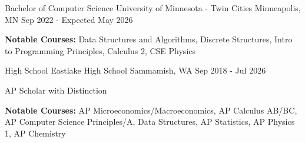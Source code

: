 

\begin{cventries}

  \cventry
    {Bachelor of Computer Science} %
    {University of Minnesota - Twin Cities} %
    {Minneapolis, MN} %
    {Sep 2022 - Expected May 2026} %
    {
      \begin{cvitems} %
        \item {\textbf{Notable Courses:} Data Structures and Algorithms, Discrete Structures, Intro to Programming Principles, Calculus 2, CSE Physics}
      \end{cvitems}
    }
    
  \cventry
    {High School} %
    {Eastlake High School} %
    {Sammamish, WA} %
    {Sep 2018 - Jul 2026} %
    {
      \begin{cvitems} %
        \item {AP Scholar with Distinction}
        \item {\textbf{Notable Courses:} AP Microeconomics/Macroeconomics, AP Calculus AB/BC, AP Computer Science Principles/A, Data Structures, AP Statistics, AP Physics 1, AP Chemistry}
      \end{cvitems}
    }
\end{cventries}
